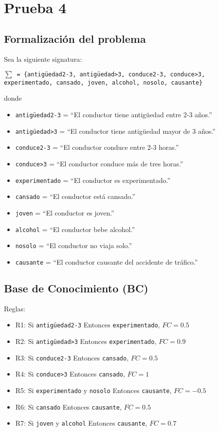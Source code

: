 \section{Prueba 4}

\subsection{Formalización del problema}
\par Sea la siguiente signatura:
\par \texttt{$\sum$ = \{antigüedad2-3, antigüedad>3, conduce2-3, conduce>3, 
experimentado, cansado, joven, alcohol, nosolo, causante\}}
\par donde
\begin{itemize}
    \item \texttt{antigüedad2-3} = ``El conductor tiene antigüedad entre 2-3 años.''
    \item \texttt{antigüedad>3} = ``El conductor tiene antigüedad mayor de 3 años.''
    \item \texttt{conduce2-3} = ``El conductor conduce entre 2-3 horas.''
    \item \texttt{conduce>3} = ``El conductor conduce más de tres horas.''
    \item \texttt{experimentado} = ``El conductor es experimentado.''
    \item \texttt{cansado} = ``El conductor está cansado.''
    \item \texttt{joven} = ``El conductor es joven.''
    \item \texttt{alcohol} = ``El conductor bebe alcohol.''
    \item \texttt{nosolo} = ``El conductor no viaja solo.''
    \item \texttt{causante} = ``El conductor causante del accidente de tráfico.''
\end{itemize}

\subsection{Base de Conocimiento (BC)}
Reglas:
\begin{itemize}
    \item R1: Si \texttt{antigüedad2-3} Entonces \texttt{experimentado}, $FC=0.5$
    \item R2: Si \texttt{antigüedad>3} Entonces \texttt{experimentado}, $FC=0.9$
    \item R3: Si \texttt{conduce2-3} Entonces \texttt{cansado}, $FC=0.5$
    \item R4: Si \texttt{conduce>3} Entonces \texttt{cansado}, $FC=1$
    \item R5: Si \texttt{experimentado} y \texttt{nosolo} Entonces \texttt{causante}, $FC=-0.5$
    \item R6: Si \texttt{cansado} Entonces \texttt{causante}, $FC=0.5$
    \item R7: Si \texttt{joven} y \texttt{alcohol} Entonces \texttt{causante}, $FC=0.7$ 
\end{itemize}

